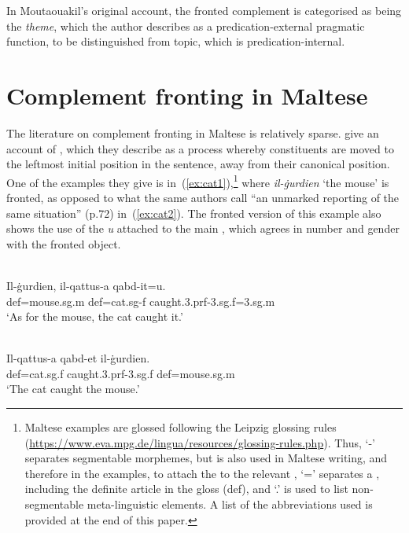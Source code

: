 \documentclass[output=paper]{LSP/langsci}
\begin{document}
In Moutaouakil's original account, the fronted complement is
categorised as being the {\em theme}, which the author describes as a
predication-external pragmatic function, to be distinguished from
topic, %
which is predication-internal.

\section{Complement fronting in Maltese}
\label{section:maltese}

The literature on complement fronting in Maltese is relatively
sparse. \citet{BorgAlexander2009} give an account of ,
which they describe as a process whereby constituents are moved to the
leftmost initial position in the sentence, away from their canonical
position. One of the examples they give is
in~(\ref{ex:cat1}),\footnote{Maltese examples are glossed following the
  Leipzig glossing rules (\url{https://www.eva.mpg.de/lingua/resources/glossing-rules.php}). Thus,
  `-' separates segmentable morphemes, but is also used in Maltese
  writing, and therefore in the examples, to attach the 
  to the relevant , `=' separates a , including the definite
  article in the gloss ({\sc def}), and `.' is used to list
  non-segmentable meta-linguistic elements. A list of the abbreviations
  used is provided at the end of this paper.} where {\em il-ġurdien} `the mouse'
is fronted, as opposed to what the same authors call ``an unmarked
reporting of the same situation'' (p.72) in~(\ref{ex:cat2}). The
fronted version of this example also shows the use of the
  {\em u} attached to the main , which agrees in
number and gender with the fronted object.


\ea\label{ex:cat1}
{\citep[71]{BorgAlexander2009}}\\
\gll Il-ġurdien, il-qattus-a qabd-it=u.\\
     {\sc def}=mouse.{\sc sg.m} {\sc def}=cat.{\sc sg}-{\sc f} caught.3.{\sc prf}-3.{\sc sg.f}=3.{\sc sg.m}\\
\glt `As for the mouse, the cat caught it.'
\z

\ea\label{ex:cat2}
{\citep[72]{BorgAlexander2009}}\\
\gll Il-qattus-a qabd-et il-ġurdien.\\
     {\sc def}=cat.{\sc sg.f}  caught.3.{\sc prf}-3.{\sc sg.f} {\sc def}=mouse.{\sc sg.m}\\
\glt `The cat caught the mouse.'
\z
\end{document}
